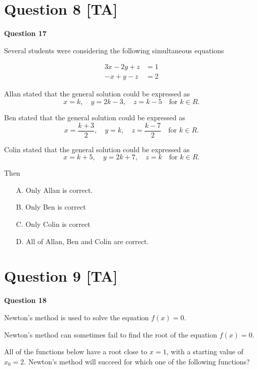 \documentclass[10pt,a4paper]{article}
\begin{document}
\vspace{9\baselineskip}

\hrulefill

\section*{Question 8 [TA]}

\textbf{Question 17}

Several students were considering the following simultaneous equations

\begin{align*}
3x - 2y + z &= 1\\
-x + y - z &= 2
\end{align*}

Allan stated that the general solution could be expressed as
\[
x = k, \quad y = 2k - 3, \quad z = k - 5 \quad \text{for } k \in R.
\]

Ben stated that the general solution could be expressed as
\[
x = \frac{k+3}{2}, \quad y = k, \quad z = \frac{k-7}{2} \quad \text{for } k \in R.
\]

Colin stated that the general solution could be expressed as
\[
x = k + 5, \quad y = 2k + 7, \quad z = k \quad \text{for } k \in R.
\]

Then

\begin{enumerate}
    \item[A.] Only Allan is correct.
    \item[B.] Only Ben is correct
    \item[C.] Only Colin is correct
    \item[D.] All of Allan, Ben and Colin are correct.
\end{enumerate}

\vspace{9\baselineskip}

\hrulefill

\section*{Question 9 [TA]}

\textbf{Question 18}

Newton's method is used to solve the equation $f(x) = 0$.

Newton's method can sometimes fail to find the root of the equation $f(x) = 0$.

All of the functions below have a root close to $x = 1$, with a starting value of $x_0 = 2$. Newton's method will succeed for which one of the following functions?
\end{document}
